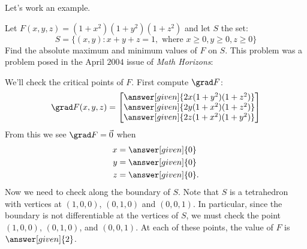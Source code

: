 \documentclass{ximera}
\begin{document}
Let's work an example.

\begin{example}
  Let $F(x,y,z) = (1+x^2)(1+y^2)(1+z^2)$ and let $S$ the set:
  \[
  S = \{(x,y):x+y+z=1,\text{ where }x\ge 0, y\ge 0,z\ge 0\}
  \]
  Find the absolute maximum and minimum values of $F$ on $S$. This
  problem was a problem posed in the April $2004$ issue of \textit{Math
    Horizons}:
  \begin{explanation}
    We'll check the critical points of $F$. First compute $\grad F$:
    \[
    \grad F(x,y,z) = \begin{bmatrix}
      \answer[given]{2x(1+y^2)(1+z^2)}\\
      \answer[given]{2y(1+x^2)(1+z^2)}\\
      \answer[given]{2z(1+x^2)(1+y^2)}
    \end{bmatrix}
    \]
    From this we see $\grad F = \vec{0}$ when
    \begin{align*}
      x &= \answer[given]{0}\\
      y &= \answer[given]{0}\\
      z &= \answer[given]{0}.
    \end{align*}
    Now we need to check along the boundary of $S$. Note that $S$ is a
    tetrahedron with vertices at $(1,0,0)$, $(0,1,0)$ and $(0,0,1)$.
    In particular, since the boundary is not differentiable at the
    vertices of $S$, we must check the point $(1,0,0)$, $(0,1,0)$, and
    $(0,0,1)$. At each of these points, the value of $F$ is
    $\answer[given]{2}$.


\end{explanation}
\end{example}
\end{document}
